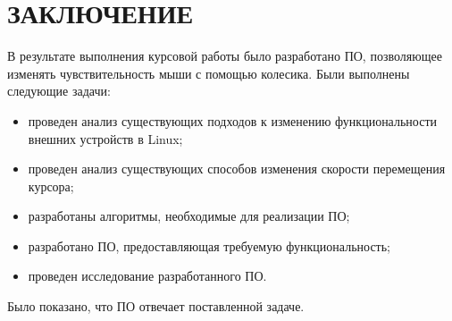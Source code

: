 \chapter*{ЗАКЛЮЧЕНИЕ}


В результате выполнения курсовой работы было разработано ПО, позволяющее изменять чувствительность мыши с помощью колесика. Были выполнены следующие задачи:
\begin{itemize}[label=---]
\item проведен анализ существующих подходов к изменению функциональности внешних устройств в Linux;
\item проведен анализ существующих способов изменения скорости перемещения курсора;
\item разработаны алгоритмы, необходимые для реализации ПО;
\item разработано ПО, предоставляющая требуемую функциональность;
\item проведен исследование разработанного ПО.
\end{itemize}

Было показано, что ПО отвечает поставленной задаче.





